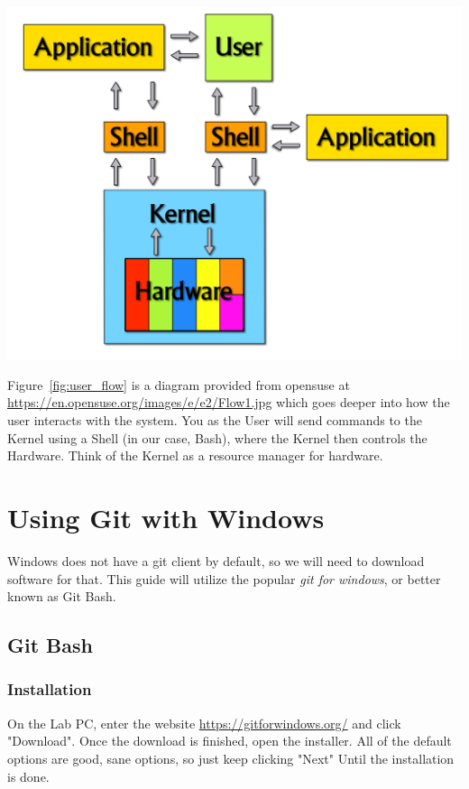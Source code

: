 \documentclass[12pt]{article}
\begin{document}
\begin{center}
    \includegraphics[scale=0.4]{Flow1.jpg}
    \label{fig:user_flow}
\end{center}

Figure~\ref{fig:user_flow} is a diagram provided from opensuse at \href{https://en.opensuse.org/images/e/e2/Flow1.jpg}{https://en.opensuse.org/images/e/e2/Flow1.jpg} which goes deeper into how the user interacts with the system. You as the User will send commands to the Kernel using a Shell (in our case, Bash), where the Kernel then controls the Hardware. Think of the Kernel as a resource manager for hardware.

\section{Using Git with Windows} \label{Using Git with Windows}
Windows does not have a git client by default, so we will need to download software for that. This guide will utilize the popular \emph{git for windows}, or better known as Git Bash.
\subsection{Git Bash}
\subsubsection{Installation} \label{Win10-GitBashInstall}
On the Lab PC, enter the website \url{https://gitforwindows.org/} and click "Download". Once the download is finished, open the installer. All of the default options are good, sane options, so just keep clicking "Next" Until the installation is done.
\end{document}
